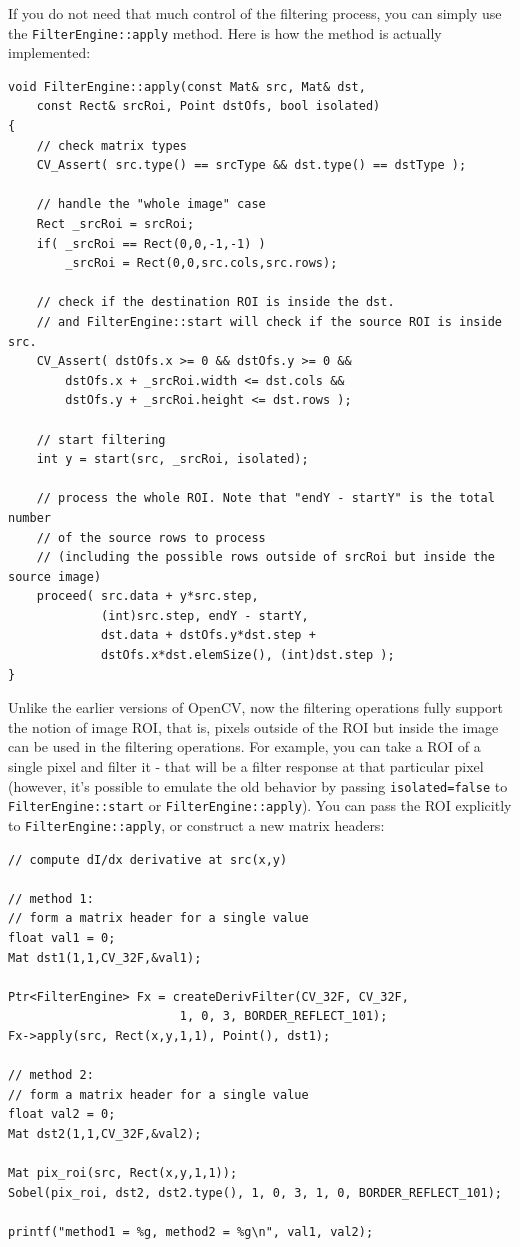 If you do not need that much control of the filtering process, you can simply use the \texttt{FilterEngine::apply} method. Here is how the method is actually implemented:

\begin{lstlisting}
void FilterEngine::apply(const Mat& src, Mat& dst,
    const Rect& srcRoi, Point dstOfs, bool isolated)
{
    // check matrix types
    CV_Assert( src.type() == srcType && dst.type() == dstType );
    
    // handle the "whole image" case
    Rect _srcRoi = srcRoi;
    if( _srcRoi == Rect(0,0,-1,-1) )
        _srcRoi = Rect(0,0,src.cols,src.rows);
    
    // check if the destination ROI is inside the dst.
    // and FilterEngine::start will check if the source ROI is inside src.
    CV_Assert( dstOfs.x >= 0 && dstOfs.y >= 0 &&
        dstOfs.x + _srcRoi.width <= dst.cols &&
        dstOfs.y + _srcRoi.height <= dst.rows );

    // start filtering
    int y = start(src, _srcRoi, isolated);
    
    // process the whole ROI. Note that "endY - startY" is the total number
    // of the source rows to process
    // (including the possible rows outside of srcRoi but inside the source image)
    proceed( src.data + y*src.step,
             (int)src.step, endY - startY,
             dst.data + dstOfs.y*dst.step +
             dstOfs.x*dst.elemSize(), (int)dst.step );
}
\end{lstlisting}

Unlike the earlier versions of OpenCV, now the filtering operations fully support the notion of image ROI, that is, pixels outside of the ROI but inside the image can be used in the filtering operations. For example, you can take a ROI of a single pixel and filter it - that will be a filter response at that particular pixel (however, it's possible to emulate the old behavior by passing \texttt{isolated=false} to \texttt{FilterEngine::start} or \texttt{FilterEngine::apply}). You can pass the ROI explicitly to \texttt{FilterEngine::apply}, or construct a new matrix headers:

\begin{lstlisting}
// compute dI/dx derivative at src(x,y)

// method 1:
// form a matrix header for a single value
float val1 = 0;
Mat dst1(1,1,CV_32F,&val1);

Ptr<FilterEngine> Fx = createDerivFilter(CV_32F, CV_32F,
                        1, 0, 3, BORDER_REFLECT_101);
Fx->apply(src, Rect(x,y,1,1), Point(), dst1);

// method 2:
// form a matrix header for a single value
float val2 = 0;
Mat dst2(1,1,CV_32F,&val2);

Mat pix_roi(src, Rect(x,y,1,1));
Sobel(pix_roi, dst2, dst2.type(), 1, 0, 3, 1, 0, BORDER_REFLECT_101);

printf("method1 = %g, method2 = %g\n", val1, val2);
\end{lstlisting}

